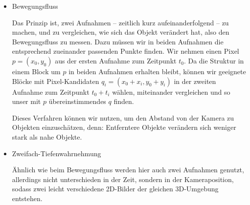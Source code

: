 \begin{itemize}
\item Bewegungsfluss

Das Prinzip ist, zwei Aufnahmen -- zeitlich kurz aufeinanderfolgend -- zu machen, und zu vergleichen, wie sich das Objekt verändert hat, also den Bewegungsfluss zu messen. Dazu müssen wir in beiden Aufnahmen die entsprechend zueinander passenden Punkte finden. Wir nehmen einen Pixel $p=(x_0,y_0)$ aus der ersten Aufnahme zum Zeitpunkt $t_0$. Da die Struktur in einem Block um $p$ in beiden Aufnahmen erhalten bleibt, können wir geeignete Blöcke mit Pixel-Kandidaten $q_i=(x_0+x_i,y_0+y_i)$ in der zweiten Aufnahme zum Zeitpunkt $t_0+t_i$ wählen, miteinander vergleichen und so unser mit $p$ übereinstimmendes $q$ finden.

Dieses Verfahren können wir nutzen, um den Abstand von der Kamera zu Objekten einzuschätzen, denn: Entferntere Objekte verändern sich weniger stark als nahe Objekte.

\item Zweifach-Tiefenwahrnehmung

Ähnlich wie beim Bewegungsfluss werden hier auch zwei Aufnahmen genutzt, allerdings nicht unterschieden in der Zeit, sondern in der Kameraposition, sodass zwei leicht verschiedene 2D-Bilder der gleichen 3D-Umgebung entstehen.


\end{itemize}
